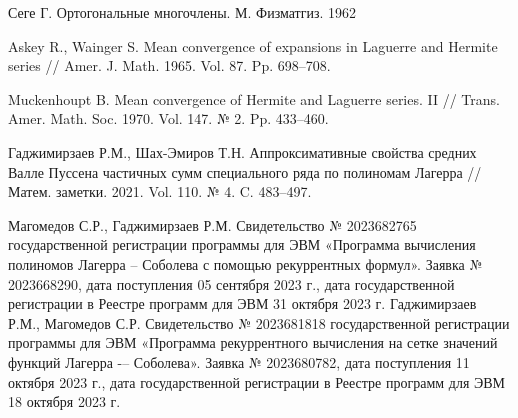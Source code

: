 \begin{thebibliography}{111}
{Сеге Г.} Ортогональные многочлены. М. Физматгиз. 1962

{Askey R., Wainger S.} Mean convergence of expansions in Laguerre and Hermite series // Amer. J. Math. 1965. Vol. 87. Pp. 698--708.

{Muckenhoupt B.} Mean convergence of Hermite and Laguerre series. II // Trans. Amer. Math. Soc. 1970. Vol. 147. № 2. Pp. 433--460.

{Гаджимирзаев Р.М., Шах-Эмиров Т.Н.} Аппроксимативные свойства средних Валле Пуссена частичных сумм специального ряда по полиномам Лагерра //
Матем. заметки. 2021. Vol. 110. № 4. C. 483--497.												

{Магомедов С.Р., Гаджимирзаев Р.М.} Свидетельство № 2023682765 государственной регистрации программы для ЭВМ «Программа вычисления полиномов Лагерра -- Соболева с помощью рекуррентных формул». Заявка № 2023668290, дата поступления 05 сентября 2023 г., дата государственной регистрации в Реестре программ для ЭВМ 31 октября 2023 г.
{Гаджимирзаев Р.М., Магомедов С.Р.} Свидетельство № 2023681818 государственной регистрации программы для ЭВМ «Программа рекуррентного вычисления на сетке значений функций Лагерра -– Соболева». Заявка № 2023680782, дата поступления 11 октября 2023 г., дата государственной регистрации в Реестре программ для ЭВМ 18 октября 2023 г.





\end{thebibliography} 